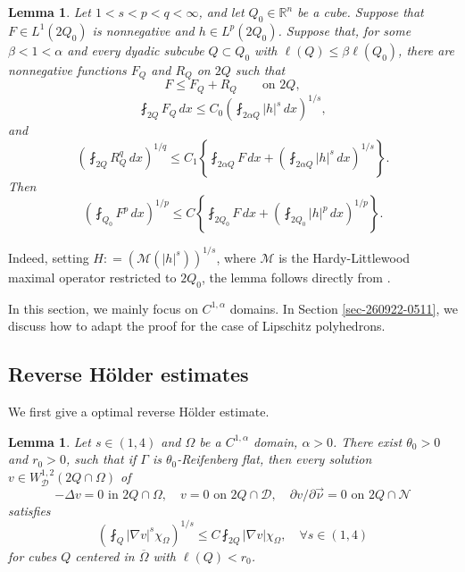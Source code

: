 \documentclass[12pt]{amsart}
\newtheorem{lemma}[theorem]{Lemma}
\numberwithin{equation}{section}
\newcommand{\bR}{\mathbb{R}}
\newcommand\cD{\mathcal{D}}
\newcommand\cN{\mathcal{N}}
\newcommand{\p}{\partial}
\begin{document}
\begin{lemma}
 \label{lem:real-variable}
 Let $1<s<p<q<\infty$, and let $Q_0 \in \bR^n$ be a cube.  Suppose that
 $F\in L^1(2Q_0)$ is nonnegative and $h\in L^p(2Q_0)$.  Suppose that, for some $\beta < 1 < \alpha$ and every dyadic
 subcube $Q\subset Q_0$ with
 $\ell(Q)\leq \beta \ell(Q_0)$, there are nonnegative
 functions $F_Q$ and $R_Q$ on $2Q$ such that
 \begin{equation}
  F\leq F_Q+R_Q\qquad\text{on }2Q,
  \label{eq:RV-decomposition}
 \end{equation}
 \begin{equation}
  \fint_{2Q}F_Q\,dx
  \leq C_0\left(\fint_{ 2\alpha Q}|h|^s\,dx\right)^{1/s},
  \label{eq:RV-low}
 \end{equation}
 and
 \begin{equation}
  \left(\fint_{2Q}R_Q^q\,dx\right)^{1/q}
  \leq C_1\left\{
      \fint_{2\alpha Q}F\,dx
      +\left(\fint_{2\alpha Q}|h|^s\,dx\right)^{1/s}
  \right\}.
  \label{eq:RV-high}
 \end{equation}
 Then
 \begin{equation}
  \left(\fint_{Q_0}F^p\,dx\right)^{1/p}
  \leq C\left\{
       \fint_{2Q_0}F\,dx
       +\left(\fint_{2Q_0}|h|^p\,dx\right)^{1/p}
  \right\}.
  \label{eq:RV-conclusion}
 \end{equation}
\end{lemma}

Indeed, setting $H: = (\mathcal M (|h|^s))^{1/s}$, where $\mathcal{M}$ is the Hardy-Littlewood maximal operator restricted to $2Q_0$, the lemma follows directly from \cite[Theorem~3.2]{Shen2007}.

In this section, we mainly focus on $C^{1,\alpha}$ domains. In Section \ref{sec-260922-0511}, we discuss how to adapt the proof for the case of Lipschitz polyhedrons.

\subsection{Reverse H\"older estimates}\label{sec-reverseholder}

We first give a optimal reverse H\"older estimate.
\begin{lemma} \label{lem-rev-holder}
    Let $s\in (1,4)$ and $\Omega$ be a $C^{1,\alpha}$ domain, $\alpha > 0$. 
    There exist $\theta_0>0$ and $r_0>0$, such that if $\Gamma$ is $\theta_0$-Reifenberg flat, then every solution $v \in W^{1,2}_{\cD}(2Q \cap \Omega)$ of
    \begin{equation} \label{eqn-260828-0335}
    -\Delta v = 0\,\,\text{in}\,\,2 Q \cap \Omega,
    \quad
    v = 0 \,\,\text{on}\,\, 2 Q \cap \cD,
    \quad
    \p v/\p \vec{\nu} = 0 \,\,\text{on}\,\, 2 Q \cap \cN
\end{equation}
satisfies
\begin{equation} \label{eqn-260826-1226}
    (\fint_{Q} |\nabla v|^s \chi_\Omega)^{1/s}
    \leq
    C \fint_{2Q} |\nabla v| \chi_\Omega,
    \quad \forall s\in (1,4)
\end{equation}
for cubes $Q$ centered in $\overline\Omega$ with $\ell(Q)<r_0$.
\end{lemma}
\end{document}
